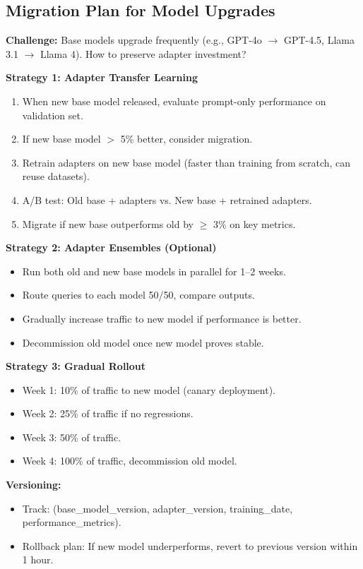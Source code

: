 \documentclass[11pt,letterpaper]{article}
\begin{document}
\subsection{Migration Plan for Model Upgrades}\label{subsec:migration-plan}

\textbf{Challenge:} Base models upgrade frequently (e.g., GPT-4o $\rightarrow$ GPT-4.5, Llama 3.1 $\rightarrow$ Llama 4). How to preserve adapter investment?

\textbf{Strategy 1: Adapter Transfer Learning}
\begin{enumerate}
\item When new base model released, evaluate prompt-only performance on validation set.
\item If new base model $>$ 5\% better, consider migration.
\item Retrain adapters on new base model (faster than training from scratch, can reuse datasets).
\item A/B test: Old base + adapters vs. New base + retrained adapters.
\item Migrate if new base outperforms old by $\geq$ 3\% on key metrics.
\end{enumerate}

\textbf{Strategy 2: Adapter Ensembles (Optional)}
\begin{itemize}
\item Run both old and new base models in parallel for 1--2 weeks.
\item Route queries to each model 50/50, compare outputs.
\item Gradually increase traffic to new model if performance is better.
\item Decommission old model once new model proves stable.
\end{itemize}

\textbf{Strategy 3: Gradual Rollout}
\begin{itemize}
\item Week 1: 10\% of traffic to new model (canary deployment).
\item Week 2: 25\% of traffic if no regressions.
\item Week 3: 50\% of traffic.
\item Week 4: 100\% of traffic, decommission old model.
\end{itemize}

\textbf{Versioning:}
\begin{itemize}
\item Track: (base\_model\_version, adapter\_version, training\_date, performance\_metrics).
\item Rollback plan: If new model underperforms, revert to previous version within 1 hour.
\end{itemize}
\end{document}
